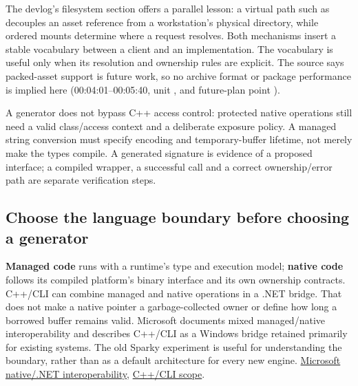 The devlog's filesystem section offers a parallel lesson: a virtual path such as  decouples an asset reference from a workstation's physical directory, while ordered mounts determine where a request resolves. Both mechanisms insert a stable vocabulary between a client and an implementation. The vocabulary is useful only when its resolution and ownership rules are explicit. The source says packed-asset support is future work, so no archive format or package performance is implied here (00:04:01--00:05:40, unit , and future-plan point ).

A generator does not bypass C++ access control: protected native operations still need a valid class/access context and a deliberate exposure policy. A managed string conversion must specify encoding and temporary-buffer lifetime, not merely make the types compile. A generated signature is evidence of a proposed interface; a compiled wrapper, a successful call and a correct ownership/error path are separate verification steps.

\subsection{Choose the language boundary before choosing a generator}\label{05-engine-i-ch024-choose-the-language-boundary-before-choosing-a-generator}

\hypertarget{05-engine-i-ch024-choose-the-language-boundary-before-choosing-a-generator}{}

\textbf{Managed code} runs with a runtime's type and execution model; \textbf{native code} follows its compiled platform's binary interface and its own ownership contracts. C++/CLI can combine managed and native operations in a .NET bridge. That does not make a native pointer a garbage-collected owner or define how long a borrowed buffer remains valid. Microsoft documents mixed managed/native interoperability and describes C++/CLI as a Windows bridge retained primarily for existing systems. The old Sparky experiment is useful for understanding the boundary, rather than as a default architecture for every new engine. \href{https://learn.microsoft.com/en-us/cpp/dotnet/native-and-dotnet-interoperability}{Microsoft native/.NET interoperability}, \href{https://learn.microsoft.com/en-us/cpp/dotnet/}{C++/CLI scope}.

